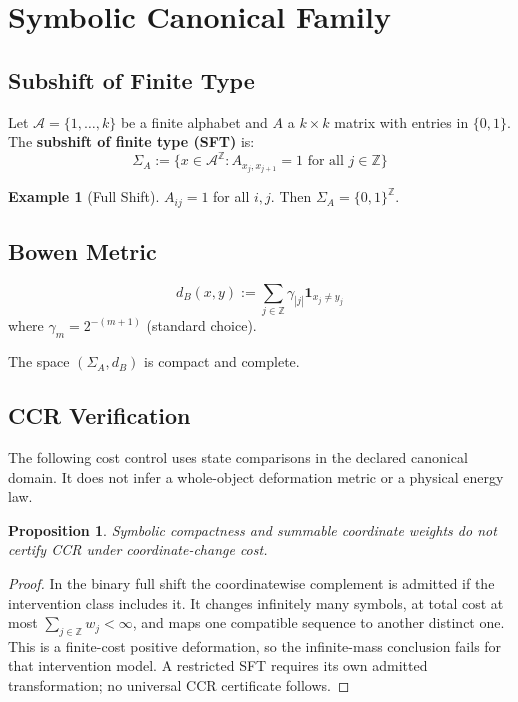 \documentclass[11pt,a4paper]{article}
\theoremstyle{plain}
\newtheorem{proposition}[theorem]{Proposition}
\theoremstyle{definition}
\newtheorem{example}[theorem]{Example}
\theoremstyle{remark}
\begin{document}
\section{Symbolic Canonical Family}

\subsection{Subshift of Finite Type}

Let $\mathcal{A} = \{1, \ldots, k\}$ be a finite alphabet and $A$ a $k \times k$ matrix with entries in $\{0,1\}$. The \textbf{subshift of finite type (SFT)} is:
\[
\Sigma_A := \{ x \in \mathcal{A}^{\mathbb{Z}} : A_{x_j, x_{j+1}} = 1 \text{ for all } j \in \mathbb{Z} \}
\]

\begin{example}[Full Shift]
$A_{ij} = 1$ for all $i,j$. Then $\Sigma_A = \{0,1\}^{\mathbb{Z}}$.
\end{example}

\subsection{Bowen Metric}

\[
d_B(x, y) := \sum_{j \in \mathbb{Z}} \gamma_{|j|} \mathbf{1}_{x_j \neq y_j}
\]
where $\gamma_m = 2^{-(m+1)}$ (standard choice).

The space $(\Sigma_A, d_B)$ is compact and complete.

\subsection{CCR Verification}

The following cost control uses state comparisons in the declared canonical domain. It does not infer a whole-object deformation metric or a physical energy law.


\begin{proposition}
Symbolic compactness and summable coordinate weights do not certify CCR under coordinate-change cost.
\end{proposition}

\begin{proof}
In the binary full shift the coordinatewise complement is admitted if the intervention class includes it. It changes infinitely many symbols, at total cost at most $\sum_{j\in\mathbb Z}w_j<\infty$, and maps one compatible sequence to another distinct one. This is a finite-cost positive deformation, so the infinite-mass conclusion fails for that intervention model. A restricted SFT requires its own admitted transformation; no universal CCR certificate follows.
\end{proof}
\end{document}
